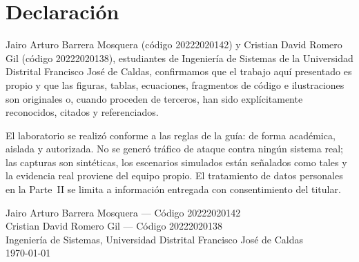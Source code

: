 \documentclass[a4paper,11pt,oneside]{book}
\begin{document}
    \newpage
    \thispagestyle{empty}
    \chapter*{\Large Declaraci\'on}
    Jairo Arturo Barrera Mosquera (c\'odigo 20222020142) y Cristian David Romero Gil
    (c\'odigo 20222020138), estudiantes de Ingenier\'ia de Sistemas de la Universidad Distrital
    Francisco Jos\'e de Caldas, confirmamos que el trabajo aqu\'i presentado es propio y que las
    figuras, tablas, ecuaciones, fragmentos de c\'odigo e ilustraciones son originales o, cuando
    proceden de terceros, han sido expl\'icitamente reconocidos, citados y referenciados.

    El laboratorio se realiz\'o conforme a las reglas de la gu\'ia: de forma acad\'emica, aislada y
    autorizada. No se gener\'o tr\'afico de ataque contra ning\'un sistema real; las capturas son
    sint\'eticas, los escenarios simulados est\'an se\~nalados como tales y la evidencia real proviene
    del equipo propio. El tratamiento de datos personales en la Parte~II se limita a informaci\'on
    entregada con consentimiento del titular.

    \vspace{1cm}
    \begin{flushright}
    Jairo Arturo Barrera Mosquera --- C\'odigo 20222020142\\
    Cristian David Romero Gil --- C\'odigo 20222020138\\
    Ingenier\'ia de Sistemas, Universidad Distrital Francisco Jos\'e de Caldas\\[0.5cm]
    \today
    \end{flushright}

    

    \tableofcontents
    \listoffigures
    \listoftables
    

    \mainmatter

    
    
    
    
    
    
    

    

    \appendix
    
\end{document}
